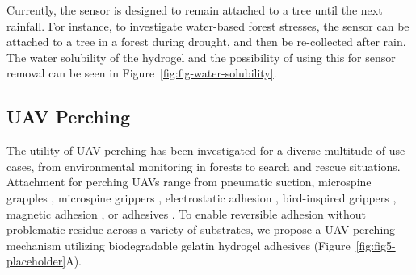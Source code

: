 Currently, the sensor is designed to remain attached to a tree until the next rainfall. For instance, to investigate water-based forest stresses, the sensor can be attached to a tree in a forest during drought, and then be re-collected after rain. The water solubility of the hydrogel and the possibility of using this for sensor removal can be seen in Figure~\ref{fig:fig-water-solubility}.



\subsection{UAV Perching}
\label{subsec:UAV_perching}

The utility of UAV perching has been investigated for a diverse multitude of use cases, from environmental monitoring in forests to search and rescue situations. Attachment for perching UAVs range from pneumatic suction\cite{Li2022, Liu2020}, microspine grapples \cite{Nguyen2019}, microspine grippers \cite{Kirchgeorg2023a}, electrostatic adhesion \cite{Graule2016}, bird-inspired grippers \cite{Roderick2021}, magnetic adhesion \cite{Zhang2017a}, or adhesives \cite{Hsiao2023}.
To enable reversible adhesion without problematic residue across a variety of substrates, we propose a UAV perching mechanism utilizing biodegradable gelatin hydrogel adhesives (Figure~\ref{fig:fig5-placeholder}A).


